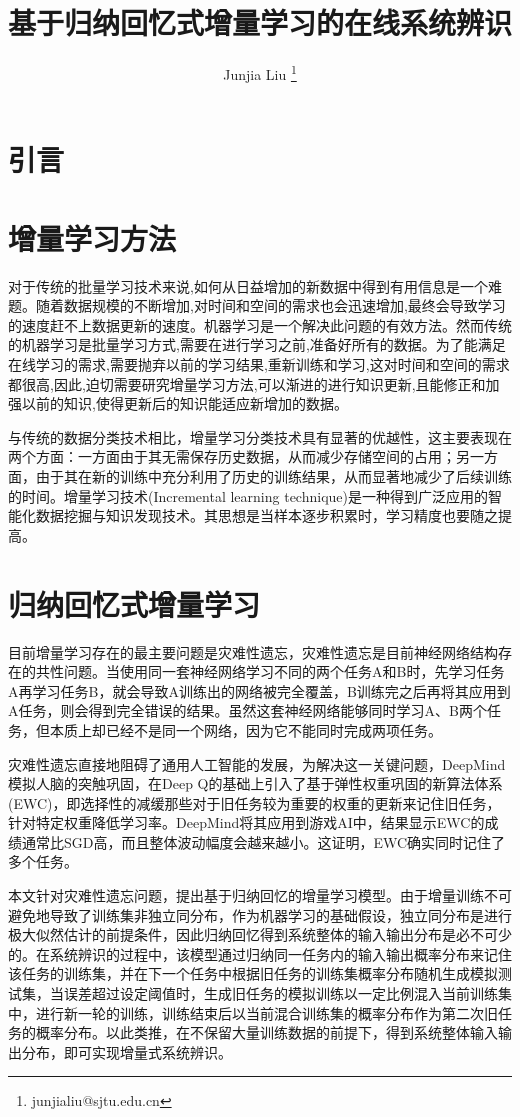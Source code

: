 \documentclass[10pt,a4paper,UTF8, twocolumn]{ctexart}
\title{基于归纳回忆式增量学习的在线系统辨识}
\author{Junjia Liu \thanks{junjialiu@sjtu.edu.cn}}
\begin{document}
	\maketitle
	\thispagestyle{fancy}
\section{引言}
	

\section{增量学习方法}
	对于传统的批量学习技术来说,如何从日益增加的新数据中得到有用信息是一个难题。随着数据规模的不断增加,对时间和空间的需求也会迅速增加,最终会导致学习的速度赶不上数据更新的速度。机器学习是一个解决此问题的有效方法。然而传统的机器学习是批量学习方式,需要在进行学习之前,准备好所有的数据。为了能满足在线学习的需求,需要抛弃以前的学习结果,重新训练和学习,这对时间和空间的需求都很高,因此,迫切需要研究增量学习方法,可以渐进的进行知识更新,且能修正和加强以前的知识,使得更新后的知识能适应新增加的数据。
	
	与传统的数据分类技术相比，增量学习分类技术具有显著的优越性，这主要表现在两个方面：一方面由于其无需保存历史数据，从而减少存储空间的占用；另一方面，由于其在新的训练中充分利用了历史的训练结果，从而显著地减少了后续训练的时间。增量学习技术(Incremental learning technique)是一种得到广泛应用的智能化数据挖掘与知识发现技术。其思想是当样本逐步积累时，学习精度也要随之提高。
	


\section{归纳回忆式增量学习}
	目前增量学习存在的最主要问题是灾难性遗忘，灾难性遗忘是目前神经网络结构存在的共性问题。当使用同一套神经网络学习不同的两个任务A和B时，先学习任务A再学习任务B，就会导致A训练出的网络被完全覆盖，B训练完之后再将其应用到A任务，则会得到完全错误的结果。虽然这套神经网络能够同时学习A、B两个任务，但本质上却已经不是同一个网络，因为它不能同时完成两项任务。
	
	灾难性遗忘直接地阻碍了通用人工智能的发展，为解决这一关键问题，DeepMind模拟人脑的突触巩固，在Deep Q的基础上引入了基于弹性权重巩固的新算法体系(EWC)，即选择性的减缓那些对于旧任务较为重要的权重的更新来记住旧任务，针对特定权重降低学习率。DeepMind将其应用到游戏AI中，结果显示EWC的成绩通常比SGD高，而且整体波动幅度会越来越小。这证明，EWC确实同时记住了多个任务。
	
	本文针对灾难性遗忘问题，提出基于归纳回忆的增量学习模型。由于增量训练不可避免地导致了训练集非独立同分布，作为机器学习的基础假设，独立同分布是进行极大似然估计的前提条件，因此归纳回忆得到系统整体的输入输出分布是必不可少的。在系统辨识的过程中，该模型通过归纳同一任务内的输入输出概率分布来记住该任务的训练集，并在下一个任务中根据旧任务的训练集概率分布随机生成模拟测试集，当误差超过设定阈值时，生成旧任务的模拟训练以一定比例混入当前训练集中，进行新一轮的训练，训练结束后以当前混合训练集的概率分布作为第二次旧任务的概率分布。以此类推，在不保留大量训练数据的前提下，得到系统整体输入输出分布，即可实现增量式系统辨识。
	
\end{document}
